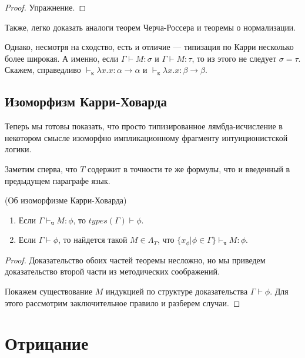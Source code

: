 \begin{proof}
Упражнение.
\end{proof}

Также, легко доказать аналоги теорем Черча-Россера и теоремы о нормализации.

Однако, несмотря на сходство, есть и отличие --- типизация по Карри несколько более
широкая. А именно, если $\Gamma\vdash M:\sigma$ и $\Gamma\vdash M:\tau$, 
то из этого не следует $\sigma=\tau$. Скажем, справедливо
$\vdash_\texttt{к}\lambda x.x : \alpha\rightarrow\alpha$ и 
$\vdash_\texttt{к}\lambda x.x : \beta\rightarrow\beta$.

\subsection{Изоморфизм Карри-Ховарда}

Теперь мы готовы показать, что просто типизированное лямбда-исчисление в некотором
смысле изоморфно импликационному фрагменту интуиционистской логики.

Заметим сперва, что $T$ содержит в точности те же формулы, что и введенный в предыдущем
параграфе язык.
                 
\begin{theorem}(Об изоморфизме Карри-Ховарда)
\begin{enumerate}
\item Если $\Gamma \vdash_\texttt{ч} M:\phi$, то $types(\Gamma) \vdash \phi$.
\item Если $\Gamma \vdash \phi$, то найдется такой $M \in \Lambda_T$, что
$\{x_\phi | \phi\in\Gamma\}\vdash_\texttt{ч} M:\phi$.
\end{enumerate}
\end{theorem}

\begin{proof}
Доказательство обоих частей теоремы несложно, но мы приведем доказательство второй части
из методических соображений.

Покажем существование $M$ индукцией по структуре доказательства $\Gamma\vdash\phi$.
Для этого рассмотрим заключительное правило и разберем случаи.

\end{proof}

\section{Отрицание}

